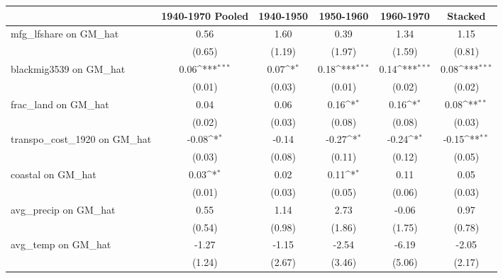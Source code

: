{
\def\sym#1{\ifmmode^{#1}\else\(^{#1}\)\fi}
\begin{tabular}{l*{5}{c}}
\toprule
                &\multicolumn{1}{c}{1940-1970 Pooled}&\multicolumn{1}{c}{1940-1950}&\multicolumn{1}{c}{1950-1960}&\multicolumn{1}{c}{1960-1970}&\multicolumn{1}{c}{Stacked}\\
\midrule
mfg\_lfshare on GM\_hat&     0.56         &     1.60         &     0.39         &     1.34         &     1.15         \\
                &   (0.65)         &   (1.19)         &   (1.97)         &   (1.59)         &   (0.81)         \\
\addlinespace
blackmig3539 on GM\_hat&     0.06\sym{***}&     0.07\sym{*}  &     0.18\sym{***}&     0.14\sym{***}&     0.08\sym{***}\\
                &   (0.01)         &   (0.03)         &   (0.01)         &   (0.02)         &   (0.02)         \\
\addlinespace
frac\_land on GM\_hat&     0.04         &     0.06         &     0.16\sym{*}  &     0.16\sym{*}  &     0.08\sym{**} \\
                &   (0.02)         &   (0.03)         &   (0.08)         &   (0.08)         &   (0.03)         \\
\addlinespace
transpo\_cost\_1920 on GM\_hat&    -0.08\sym{*}  &    -0.14         &    -0.27\sym{*}  &    -0.24\sym{*}  &    -0.15\sym{**} \\
                &   (0.03)         &   (0.08)         &   (0.11)         &   (0.12)         &   (0.05)         \\
\addlinespace
coastal on GM\_hat&     0.03\sym{*}  &     0.02         &     0.11\sym{*}  &     0.11         &     0.05         \\
                &   (0.01)         &   (0.03)         &   (0.05)         &   (0.06)         &   (0.03)         \\
\addlinespace
avg\_precip on GM\_hat&     0.55         &     1.14         &     2.73         &    -0.06         &     0.97         \\
                &   (0.54)         &   (0.98)         &   (1.86)         &   (1.75)         &   (0.78)         \\
\addlinespace
avg\_temp on GM\_hat&    -1.27         &    -1.15         &    -2.54         &    -6.19         &    -2.05         \\
                &   (1.24)         &   (2.67)         &   (3.46)         &   (5.06)         &   (2.17)         \\

\end{tabular}}
